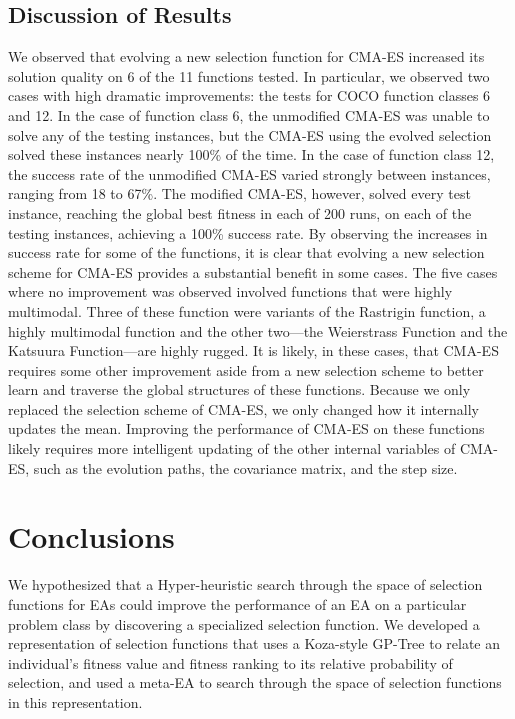 \documentclass[sigconf]{acmart}
\begin{document}
\subsection{Discussion of Results}
\label{resultsDiscussion}

We observed that evolving a new selection function for CMA-ES increased its solution quality on 6 of the 11 functions tested. In particular, we observed two cases with high dramatic improvements: the tests for COCO function classes 6 and 12. In the case of function class 6, the unmodified CMA-ES was unable to solve any of the testing instances, but the CMA-ES using the evolved selection solved these instances nearly 100\% of the time. In the case of function class 12, the success rate of the unmodified CMA-ES varied strongly between instances, ranging from 18 to 67\%. The modified CMA-ES, however, solved every test instance, reaching the global best fitness in each of 200 runs, on each of the testing instances, achieving a 100\% success rate. By observing the increases in success rate for some of the functions, it is clear that evolving a new selection scheme for CMA-ES provides a substantial benefit in some cases. The five cases where no improvement was observed involved functions that were highly multimodal. Three of these function were variants of the Rastrigin function, a highly multimodal function and the other two---the Weierstrass Function and the Katsuura Function---are highly rugged. It is likely, in these cases, that CMA-ES requires some other improvement aside from a new selection scheme to better learn and traverse the global structures of these functions. Because we only replaced the selection scheme of CMA-ES, we only changed how it internally updates the mean. Improving the performance of CMA-ES on these functions likely requires more intelligent updating of the other internal variables of CMA-ES, such as the evolution paths, the covariance matrix, and the step size.

\section{Conclusions}
\label{Conclusion}
We hypothesized that a Hyper-heuristic search through the space of selection functions for EAs could improve the performance of an EA on a particular problem class by discovering a specialized selection function. We developed a representation of selection functions that uses a Koza-style GP-Tree to relate an individual's fitness value and fitness ranking to its relative probability of selection, and used a meta-EA to search through the space of selection functions in this representation. 
\end{document}

